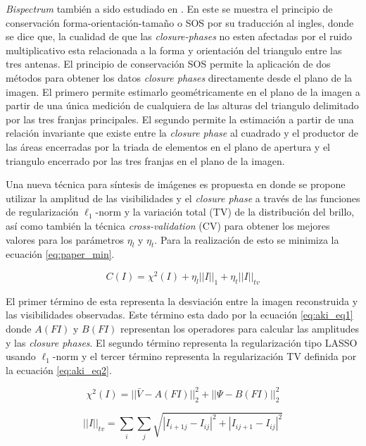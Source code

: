 \textit{Bispectrum} también a sido estudiado en \citet{geometry}. En este se muestra el principio de conservación forma-orientación-tamaño o SOS por su traducción al ingles, donde se dice que, la cualidad de que las \textit{closure-phases} no esten afectadas por el ruido multiplicativo esta relacionada a la forma y orientación del triangulo entre las tres antenas. El principio de conservación SOS permite la aplicación de dos métodos para obtener los datos \textit{closure phases} directamente desde el plano de la imagen. El primero permite estimarlo geométricamente en el plano de la imagen a partir de una única medición de cualquiera de las alturas del triangulo delimitado por las tres franjas principales. El segundo permite la estimación a partir de una relación invariante que existe entre la \textit{closure phase} al cuadrado y el productor de las áreas encerradas por la triada de elementos en el plano de apertura y el triangulo encerrado por las tres franjas en el plano de la imagen. 

Una nueva técnica para síntesis de imágenes es propuesta en \citet{akiyama2017imaging} donde se propone utilizar la amplitud de las visibilidades y el \textit{closure phase} a través de las funciones de regularización $\ell_{1}$-norm y la variación total (TV) de la distribución del brillo, así como también la técnica \textit{cross-validation} (CV) para obtener los mejores valores para los parámetros $\eta_{l}$ y $\eta_{t}$. Para la realización de esto se minimiza la ecuación \ref{eq:paper_min}. 

\begin{equation}
    \label{eq:paper_min}
    C(I) = \chi^{2}(I) + \eta_{l} ||I||_{1} + \eta_{t} ||I||_{tv}
\end{equation}

El primer término de esta representa la desviación entre la imagen reconstruida y las visibilidades observadas. Este término esta dado por la ecuación \ref{eq:aki_eq1} donde $A(FI)$ y $B(FI)$ representan los operadores para calcular las amplitudes y las \textit{closure phases}. El segundo término representa la regularización tipo LASSO usando $\ell_{1}$-norm y el tercer término representa la regularización TV definida por la ecuación \ref{eq:aki_eq2}.

\begin{equation}
    \label{eq:aki_eq1}
    \chi^{2}(I) = || \bar{V} - A(FI)||^{2}_{2} + || \Psi - B(FI) ||^{2}_{2}
\end{equation}

\begin{equation}
    \label{eq:aki_eq2}
    ||I||_{tv} = \sum_{i} \sum_{j} \sqrt{|I_{i+1j} - I_{ij}|^{2} + |I_{ij+1} - I_{ij}|^{2}}
\end{equation}

